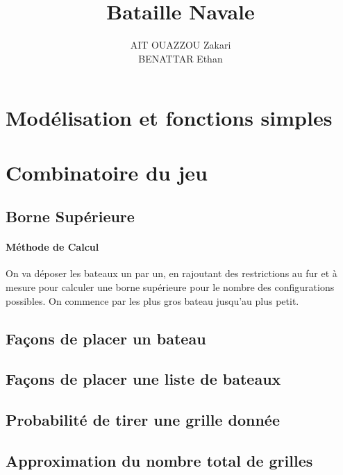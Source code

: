 \documentclass[12pt]{article}
\begin{document}
 
 
\title{Bataille Navale}%
\author{AIT OUAZZOU Zakari\\ %
BENATTAR Ethan} %
 
\maketitle

\section{Modélisation et fonctions simples}
\section{Combinatoire du jeu}
\subsection{Borne Supérieure}
\paragraph{Méthode de Calcul}

On va déposer les bateaux un par un, en rajoutant des restrictions au fur et à mesure pour calculer une borne supérieure pour le nombre des configurations possibles. On commence par les plus gros bateau jusqu'au plus petit.

\subsection{Façons de placer un bateau}

\subsection{Façons de placer une liste de bateaux}

\subsection{Probabilité de tirer une grille donnée}

\subsection{Approximation du nombre total de grilles}
\end{document}
